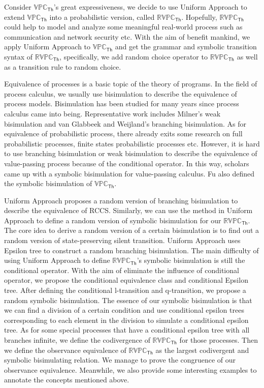 \begin{digest}
  Consider $\mathbb{VPC}_{\mathsf{Th}}$’s great expressiveness, we decide to use Uniform Approach to extend $\mathbb{VPC}_{\mathsf{Th}}$ into a probabilistic version, called $\mathbb{RVPC}_{\mathsf{Th}}$. Hopefully, $\mathbb{RVPC}_{\mathsf{Th}}$ could help to model and analyze some meaningful real-world process such as communication and network security etc. With the aim of benefit mankind, we apply Uniform Approach to $\mathbb{VPC}_{\mathsf{Th}}$ and get the grammar and symbolic transition syntax of $\mathbb{RVPC}_{\mathsf{Th}}$, specifically, we add random choice operator to $\mathbb{RVPC}_{\mathsf{Th}}$ as well as a transition rule to random choice. 
  
  Equivalence of processes is a basic topic of the theory of programs. In the field of process calculus, we usually use bisimulation to describe the equivalence of process models. Bisimulation has been studied for many years since process calculus came into being. Representative work includes Milner’s weak bisimulation and van Glabbeek and Weijland’s branching bisimulation. As for equivalence of probabilistic process, there already exits some research on full probabilistic processes, finite states probabilistic processes etc. However, it is hard to use branching bisimulation or weak bisimulation to describe the equivalence of value-passing process because of the conditional operator. In this way, scholars came up with a symbolic bisimulation for value-passing calculus. Fu also defined the symbolic bisimulation of $\mathbb{VPC}_{\mathsf{Th}}$. 
  
  Uniform Approach proposes a random version of branching bisimulation to describe the equivalence of RCCS. Similarly, we can use the method in Uniform Approach to define a random version of symbolic bisimulation for our $\mathbb{RVPC}_{\mathsf{Th}}$. The core idea to derive a random version of a certain bisimulation is to find out a random version of state-preserving silent transition. Uniform Approach uses Epsilon tree to construct a random branching bisimulation. The main difficulty of using Uniform Approach to define $\mathbb{RVPC}_{\mathsf{Th}}$’s symbolic bisimulation is still the conditional operator. With the aim of eliminate the influence of conditional operator, we propose the conditional equivalence class and conditional Epsilon tree. After defining the conditional l-transition and q-transition, we propose a random symbolic bisimulation. The essence of our symbolic bisimulation is that we can find a division of a certain condition and use conditional epsilon trees corresponding to each element in the division to simulate a conditional epsilon tree. As for some special processes that have a conditional epsilon tree with all branches infinite, we define the codivergence of $\mathbb{RVPC}_{\mathsf{Th}}$ for those processes. Then we define the observance equivalence of $\mathbb{RVPC}_{\mathsf{Th}}$ as the largest codivergent and symbolic bisimulating relation. We manage to prove the congruence of our observance equivalence. Meanwhile, we also provide some interesting examples to annotate the concepts mentioned above.
  

\end{digest}
